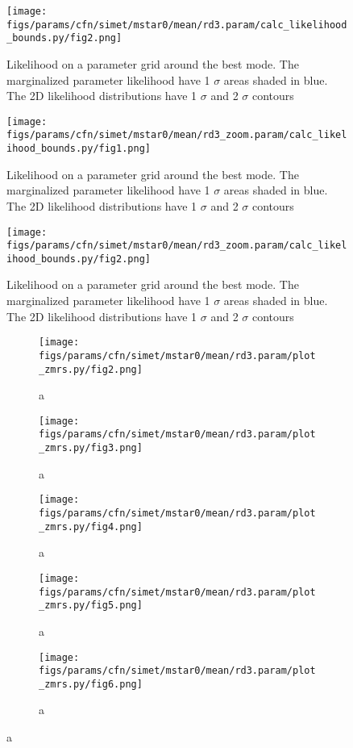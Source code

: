 \documentclass[twocolumn]{article}
\begin{document}
\begin{figure}[H]
  \center\texttt{[image: figs/params/cfn/simet/mstar0/mean/rd3.param/calc\_likelihood\_bounds.py/fig2.png]}
  \caption{Likelihood on a parameter grid around the best mode. The marginalized parameter likelihood have
    1 $\sigma$ areas shaded in blue. The 2D likelihood distributions have 1 $\sigma$  and 2 $\sigma$ contours}
  \label{fig:basic_rd:likelihood}
\end{figure}

\begin{figure}[H]
  \center\texttt{[image: figs/params/cfn/simet/mstar0/mean/rd3\_zoom.param/calc\_likelihood\_bounds.py/fig1.png]}
  \caption{Likelihood on a parameter grid around the best mode. The marginalized parameter likelihood have
    1 $\sigma$ areas shaded in blue. The 2D likelihood distributions have 1 $\sigma$  and 2 $\sigma$ contours}
  \label{fig:basic_rd:likelihood}
\end{figure}

\begin{figure}[H]
  \center\texttt{[image: figs/params/cfn/simet/mstar0/mean/rd3\_zoom.param/calc\_likelihood\_bounds.py/fig2.png]}
  \caption{Likelihood on a parameter grid around the best mode. The marginalized parameter likelihood have
    1 $\sigma$ areas shaded in blue. The 2D likelihood distributions have 1 $\sigma$  and 2 $\sigma$ contours}
  \label{fig:basic_rd:likelihood}
\end{figure}


\begin{figure}
  \begin{subfigure}{.5\textwidth}
    \centering\texttt{[image: figs/params/cfn/simet/mstar0/mean/rd3.param/plot\_zmrs.py/fig2.png]}
    \caption{a}
  \end{subfigure}
  \begin{subfigure}{.5\textwidth}
    \centering\texttt{[image: figs/params/cfn/simet/mstar0/mean/rd3.param/plot\_zmrs.py/fig3.png]}
    \caption{a}
  \end{subfigure}
  \begin{subfigure}{.5\textwidth}
    \centering\texttt{[image: figs/params/cfn/simet/mstar0/mean/rd3.param/plot\_zmrs.py/fig4.png]}
    \caption{a}
  \end{subfigure}%
  \begin{subfigure}{.5\textwidth}
    \centering\texttt{[image: figs/params/cfn/simet/mstar0/mean/rd3.param/plot\_zmrs.py/fig5.png]}
    \caption{a}
  \end{subfigure}
  \begin{subfigure}{.5\textwidth}
    \centering\texttt{[image: figs/params/cfn/simet/mstar0/mean/rd3.param/plot\_zmrs.py/fig6.png]}
    \caption{a}
  \end{subfigure}
  
\end{figure}
\clearpage
\end{document}
